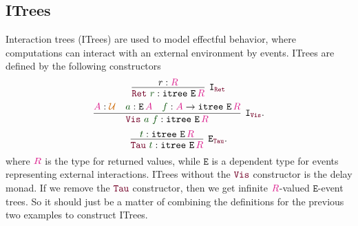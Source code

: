 \documentclass[twoside,11pt,openright]{report}
\theoremstyle{plain} %
\theoremstyle{definition}
\theoremstyle{remark}
\newcommand*{\term}[1]{\textcolor{green!30!black}{#1}} %
\newcommand*{\type}[1]{\textcolor{magenta!90!black}{#1}}
\newcommand*{\universe}[1]{\textcolor{orange!80!black}{#1}}
\newcommand*{\constructor}[1]{\textcolor{purple!60!black}{\ensuremath{\mathtt{#1}}}}
\newcommand*{\typeformer}[1]{\ensuremath{\mathtt{#1}}}
\begin{document}
\subsection{ITrees}
Interaction trees (ITrees) \cite{DBLP:itrees} are used to model effectful behavior, where computations can interact with an external environment by events. ITrees are defined by the following constructors
\begin{equation}
  \vcenter{\infer[\mathtt{I}_{\constructor{Ret}}]{\constructor{Ret}~\term{r} : \typeformer{itree}~\typeformer{E}\,\type{R}}{r : \type{R}}}
\end{equation}
\begin{equation}
  \vcenter{\infer[\mathtt{I}_{\constructor{Vis}}]{\constructor{Vis}~\term{a}~\term{f} : \typeformer{itree}~\typeformer{E}\,\type{R}}{\type{A} : \universe{\mathcal{U}} & \term{a} : \typeformer{E}\,\type{A} & \term{f} : \type{A} \rightarrow \typeformer{itree}~\typeformer{E}\,\type{R}}}.
\end{equation}
\begin{equation}
  \vcenter{\infer[\mathtt{E}_{\constructor{Tau}}]{\constructor{Tau}~\term{t} : \typeformer{itree}~\typeformer{E}\,\type{R}}{\term{t} : \typeformer{itree}~\typeformer{E}\,\type{R}}}.
\end{equation}
where \(\type{R}\) is the type for returned values, while \(\typeformer{E}\) is a dependent type for events representing external interactions. ITrees without the \(\constructor{Vis}\) constructor is the delay monad. If we remove the \(\constructor{Tau}\) constructor, then we get infinite \(\type{R}\)-valued \(\typeformer{E}\)-event trees. So it should just be a matter of combining the definitions for the previous two examples to construct ITrees.
\end{document}

